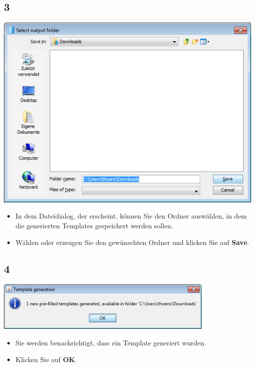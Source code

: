 \documentclass{beamer}
\begin{document}
\subsection{3}
\begin{frame}
	\begin{center}
  		\includegraphics[height=0.5\textheight]{3.png}
	\end{center}
	\begin{itemize}
		\item In dem Dateidialog, der erscheint, können Sie den Ordner auswählen, in dem die generierten Templates gespeichert werden sollen.
		\item Wählen oder erzeugen Sie den gewünschten Ordner und klicken Sie auf \textbf{Save}.		
	\end{itemize}
\end{frame}

\subsection{4}
\begin{frame}
	\begin{center}
  		\includegraphics[width=0.8\textwidth]{4.png}
	\end{center}
	\begin{itemize}
		\item Sie werden benachrichtigt, dass ein Template generiert wurden.
		\item Klicken Sie auf \textbf{OK}.
	\end{itemize}
\end{frame}
\end{document}
